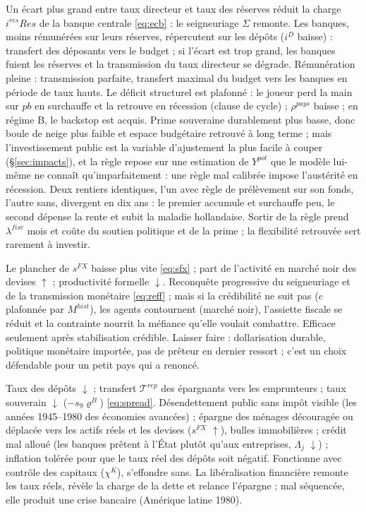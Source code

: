 \documentclass[11pt,a4paper]{article}
\newcommand{\up}{$\uparrow$}
\newcommand{\dn}{$\downarrow$}
\begin{document}
\direct Un écart plus grand entre taux directeur et taux des réserves réduit la charge $i^{res}Res$ de la banque centrale \eqref{eq:ecb} : le seigneuriage $\Sigma$ remonte.
\second Les banques, moins rémunérées sur leurs réserves, répercutent sur les dépôts ($i^D$ baisse) : transfert des déposants vers le budget ; si l'écart est trop grand, les banques fuient les réserves et la transmission du taux directeur se dégrade.
\baisse Rémunération pleine : transmission parfaite, transfert maximal du budget vers les banques en période de taux hauts.
\direct Le déficit structurel est plafonné : le joueur perd la main sur $pb$ en surchauffe et la retrouve en récession (clause de cycle) ; $\rho^{pays}$ baisse ; en régime B, le backstop est acquis.
\second Prime souveraine durablement plus basse, donc boule de neige plus faible et espace budgétaire retrouvé à long terme ; mais l'investissement public est la variable d'ajustement la plus facile à couper (\S\ref{sec:impacts}), et la règle repose sur une estimation de $Y^{pot}$ que le modèle lui-même ne connaît qu'imparfaitement : une règle mal calibrée impose l'austérité en récession. Deux rentiers identiques, l'un avec règle de prélèvement sur son fonds, l'autre sans, divergent en dix ans : le premier accumule et surchauffe peu, le second dépense la rente et subit la maladie hollandaise.
\baisse Sortir de la règle prend $\lambda^{fisc}$ mois et coûte du soutien politique et de la prime ; la flexibilité retrouvée sert rarement à investir.

\direct Le plancher de $s^{FX}$ baisse plus vite \eqref{eq:sfx} ; part de l'activité en marché noir des devises \up{} ; productivité formelle \dn.
\second Reconquête progressive du seigneuriage et de la transmission monétaire \eqref{eq:reff} ; mais si la crédibilité ne suit pas ($c$ plafonnée par $M^{hist}$), les agents contournent (marché noir), l'assiette fiscale se réduit et la contrainte nourrit la méfiance qu'elle voulait combattre. Efficace seulement après stabilisation crédible.
\baisse Laisser faire : dollarisation durable, politique monétaire importée, pas de prêteur en dernier ressort ; c'est un choix défendable pour un petit pays qui a renoncé.

\direct Taux des dépôts \dn{} ; transfert $\mathcal{T}^{rep}$ des épargnants vers les emprunteurs ; taux souverain \dn{} ($-s_9\varrho^B$) \eqref{eq:spread}.
\second Désendettement public sans impôt visible (les années 1945--1980 des économies avancées) ; épargne des ménages découragée ou déplacée vers les actifs réels et les devises ($s^{FX}$ \up), bulles immobilières ; crédit mal alloué (les banques prêtent à l'État plutôt qu'aux entreprises, $\Lambda_j$ \dn) ; inflation tolérée pour que le taux réel des dépôts soit négatif. Fonctionne avec contrôle des capitaux ($\chi^K$), s'effondre sans.
\baisse La libéralisation financière remonte les taux réels, révèle la charge de la dette et relance l'épargne ; mal séquencée, elle produit une crise bancaire (Amérique latine 1980).
\end{document}
